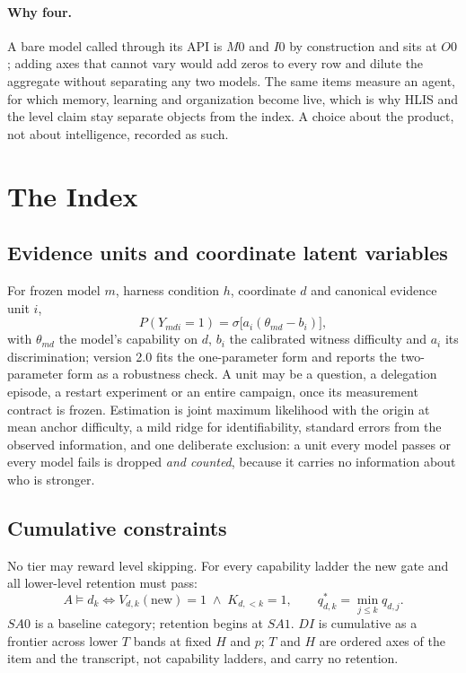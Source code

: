 \documentclass[11pt]{article}
\theoremstyle{definition}
\begin{document}
\paragraph{Why four.} A bare model called through its API is $M0$ and $I0$ by construction and sits at $O0$; adding axes that cannot vary would add zeros to every row and dilute the aggregate without separating any two models. The same items measure an agent, for which memory, learning and organization become live, which is why HLIS and the level claim stay separate objects from the index. A choice about the product, not about intelligence, recorded as such.

\section{The Index}\label{sec:index}

\subsection{Evidence units and coordinate latent variables}
For frozen model $m$, harness condition $h$, coordinate $d$ and canonical evidence unit $i$,
\[
P(Y_{mdi} = 1) = \sigma\!\big[a_i(\theta_{md} - b_i)\big],
\]
with $\theta_{md}$ the model's capability on $d$, $b_i$ the calibrated witness difficulty and $a_i$ its discrimination; version 2.0 fits the one-parameter form and reports the two-parameter form as a robustness check. A unit may be a question, a delegation episode, a restart experiment or an entire campaign, once its measurement contract is frozen. Estimation is joint maximum likelihood with the origin at mean anchor difficulty, a mild ridge for identifiability, standard errors from the observed information, and one deliberate exclusion: a unit every model passes or every model fails is dropped \emph{and counted}, because it carries no information about who is stronger.

\subsection{Cumulative constraints}
No tier may reward level skipping. For every capability ladder the new gate and all lower-level retention must pass:
\[
A \models d_k \iff V_{d,k}(\text{new}) = 1 \;\wedge\; K_{d,<k} = 1, \qquad q^{*}_{d,k} = \min_{j \le k} q_{d,j}.
\]
$SA0$ is a baseline category; retention begins at $SA1$. $DI$ is cumulative as a frontier across lower $T$ bands at fixed $H$ and $p$; $T$ and $H$ are ordered axes of the item and the transcript, not capability ladders, and carry no retention.
\end{document}
